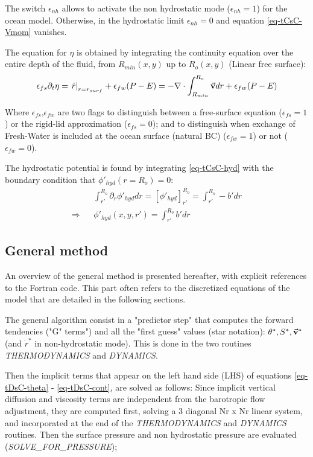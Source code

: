 The switch $\epsilon_{nh}$ allows to activate the non hydrostatic
mode ($\epsilon_{nh}=1$) for the ocean model. Otherwise, 
in the hydrostatic limit $\epsilon_{nh} = 0$ 
and equation \ref{eq-tCsC-Vmom} vanishes.

The equation for $\eta$ is obtained by integrating the 
continuity equation over the entire depth of the fluid, 
from $R_{min}(x,y)$ up to $R_o(x,y)$ 
(Linear free surface):
\begin{eqnarray}
\epsilon_{fs} \partial_t \eta =
\left. \dot{r} \right|_{r=r_{surf}} + \epsilon_{fw} (P-E) =
- {\bf \nabla} \cdot \int_{R_{min}}^{R_o} \vec{\bf v} dr
+ \epsilon_{fw} (P-E)
\label{eq-tCsC-eta}
\end{eqnarray}

Where $\epsilon_{fs}$,$\epsilon_{fw}$ are two flags to 
distinguish between a free-surface equation ($\epsilon_{fs}=1$) 
or the rigid-lid approximation ($\epsilon_{fs}=0$);  
and to distinguish when exchange of Fresh-Water is included 
at the ocean surface (natural BC) ($\epsilon_{fw} = 1$) 
or not ($\epsilon_{fw} = 0$).

The hydrostatic potential is found by
integrating \ref{eq-tCsC-hyd} with the boundary condition that
$\phi'_{hyd}(r=R_o) = 0$:
\begin{eqnarray*}
& &
\int_{r'}^{R_o} \partial_r \phi'_{hyd} dr =
\left[ \phi'_{hyd} \right]_{r'}^{R_o} =
\int_{r'}^{R_o} - b' dr
\\
\Rightarrow & &
\phi'_{hyd}(x,y,r') = \int_{r'}^{R_o} b' dr
\end{eqnarray*}

\subsection{General method}
 
An overview of the general method is presented hereafter, 
with explicit references to the Fortran code. This part
often refers to the discretized equations of the model
that are detailed in the following sections.

The general algorithm consist in  a "predictor step" that computes
the forward tendencies ("G" terms") and all 
the "first guess" values (star notation): 
$\theta^*, S^*, \vec{\bf v}^*$ (and $\dot{r}^*$
in non-hydrostatic mode). This is done in the two routines 
{\it THERMODYNAMICS} and {\it DYNAMICS}.

Then the implicit terms that appear on the left hand side (LHS)
of equations \ref{eq-tDsC-theta} - \ref{eq-tDsC-cont},
are solved as follows:
Since implicit vertical diffusion and viscosity terms 
are independent from the barotropic flow adjustment,
they are computed first, solving a 3 diagonal Nr x Nr linear system, 
and incorporated at the end of the {\it THERMODYNAMICS} and 
{\it DYNAMICS} routines.
Then the surface pressure and non hydrostatic pressure
are evaluated ({\it SOLVE\_FOR\_PRESSURE}); 

